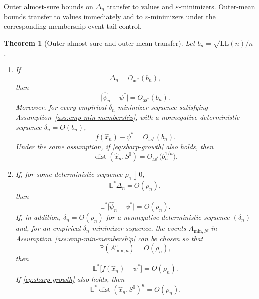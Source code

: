\documentclass[11pt]{article}
\newtheorem{theorem}{Theorem}[section]
\begin{document}
Outer almost-sure bounds on $\Delta_{n}$ transfer to values and
$\varepsilon$-minimizers. Outer-mean bounds transfer to values immediately
and to $\varepsilon$-minimizers under the corresponding membership-event
tail control.


\begin{theorem}[Outer almost-sure and outer-mean transfer]\label{thm:as-mean}
Let $b_{n}=\sqrt{\mathrm{LL}(n)/n}$. 
\begin{enumerate}[label=(\roman*),itemsep=0.25em]
\item If
\begin{equation}
\Delta_{n}=O_{\mathrm{as}^{*}}(b_{n}),\label{eq:blil-input}
\end{equation}
then
\begin{equation}
\lvert\hat{\psi}_{n}-\psi^{*}\rvert=O_{\mathrm{as}^{*}}(b_{n}).\label{eq:as-value}
\end{equation}
Moreover, for every empirical $\delta_{n}$-minimizer sequence satisfying
Assumption~\ref{ass:emp-min-membership}, with a nonnegative deterministic
sequence $\delta_{n}=O(b_{n})$,
\begin{equation}
f(\hat{x}_{n})-\psi^{*}=O_{\mathrm{as}^{*}}(b_{n}).\label{eq:as-excess}
\end{equation}
Under the same assumption, if \eqref{eq:sharp-growth} also holds, then
\begin{equation}
\operatorname{dist}(\hat{x}_{n},S^{0})=O_{\mathrm{as}^{*}}\bigl(b_{n}^{1/\kappa}\bigr).\label{eq:as-distance}
\end{equation}
\item If, for some deterministic sequence $\rho_{n}\downarrow0$, 
\begin{equation}
\mathbb{E}^{*}\Delta_{n}=O(\rho_{n}),\label{eq:mean-input}
\end{equation}
then 
\begin{equation}
\mathbb{E}^{*}\lvert\hat{\psi}_{n}-\psi^{*}\rvert=O(\rho_{n}).\label{eq:mean-value}
\end{equation}
If, in addition, $\delta_{n}=O(\rho_{n})$ for a nonnegative deterministic
sequence $(\delta_{n})$ and, for an empirical $\delta_{n}$-minimizer sequence,
the events $A_{\mathrm{min},N}$ in Assumption~\ref{ass:emp-min-membership}
can be chosen so that
\[
\mathbb{P}(A_{\mathrm{min},n}^{c})=O(\rho_{n}),
\]
then
\begin{equation}
\mathbb{E}^{*}\bigl[f(\hat{x}_{n})-\psi^{*}\bigr]=O(\rho_{n}).\label{eq:mean-excess}
\end{equation}
If \eqref{eq:sharp-growth} also holds, then 
\begin{equation}
\mathbb{E}^{*}\operatorname{dist}(\hat{x}_{n},S^{0})^{\kappa}=O(\rho_{n}).\label{eq:mean-distance}
\end{equation}
\end{enumerate}
\end{theorem}
\end{document}
